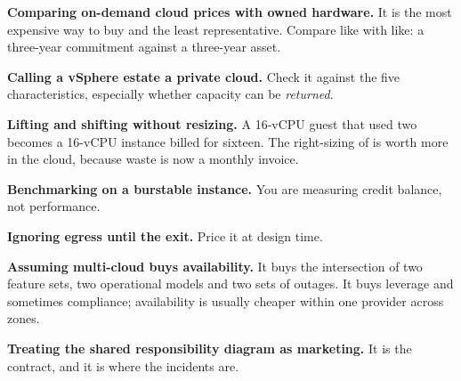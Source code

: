 \begin{pitfall}
\begin{tight}
  \item \textbf{Comparing on-demand cloud prices with owned hardware.} It is
        the most expensive way to buy and the least representative. Compare
        like with like: a three-year commitment against a three-year asset.
  \item \textbf{Calling a vSphere estate a private cloud.} Check it against the
        five characteristics, especially whether capacity can be \emph{returned}.
  \item \textbf{Lifting and shifting without resizing.} A 16-vCPU guest that
        used two becomes a 16-vCPU instance billed for sixteen. The
        right-sizing of  is worth more in the cloud, because
        waste is now a monthly invoice.
  \item \textbf{Benchmarking on a burstable instance.} You are measuring credit
        balance, not performance.
  \item \textbf{Ignoring egress until the exit.} Price it at design time.
  \item \textbf{Assuming multi-cloud buys availability.} It buys the
        intersection of two feature sets, two operational models and two sets
        of outages. It buys leverage and sometimes compliance; availability is
        usually cheaper within one provider across zones.
  \item \textbf{Treating the shared responsibility diagram as marketing.} It is
        the contract, and it is where the incidents are.
\end{tight}
\end{pitfall}

